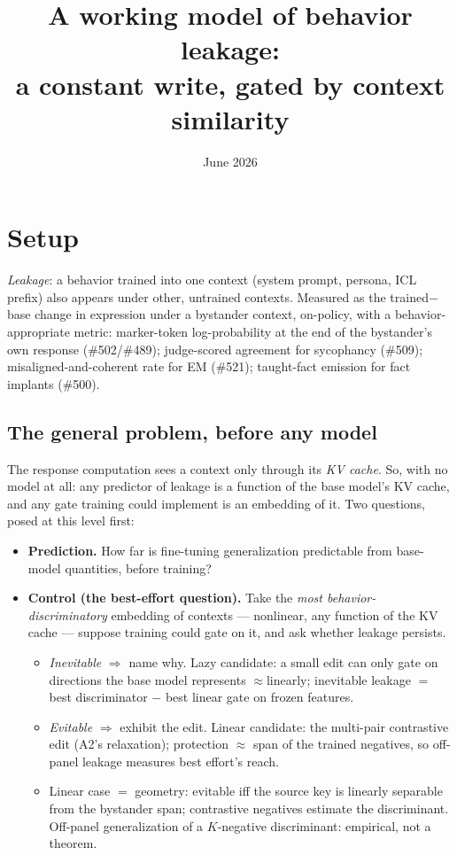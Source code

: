 \documentclass[11pt]{article}
\title{A working model of behavior leakage:\\ a constant write, gated by context similarity}
\author{}
\date{June 2026}
\begin{document}
\maketitle
\vspace{-3em}

\section{Setup}
\label{sec:setup}

\emph{Leakage}: a behavior trained into one context (system prompt, persona, ICL prefix) also appears under other, untrained contexts. Measured as the trained$-$base change in expression under a bystander context, on-policy, with a behavior-appropriate metric: marker-token log-probability at the end of the bystander's own response (\#502/\#489); judge-scored agreement for sycophancy (\#509); misaligned-and-coherent rate for EM (\#521); taught-fact emission for fact implants (\#500).

\subsection{The general problem, before any model}
\label{sec:general}

The response computation sees a context only through its \emph{KV cache}. So, with no model at all: any predictor of leakage is a function of the base model's KV cache, and any gate training could implement is an embedding of it. Two questions, posed at this level first:

\begin{itemize}
\item \textbf{Prediction.} How far is fine-tuning generalization predictable from base-model quantities, before training?
\item \textbf{Control (the best-effort question).} Take the \emph{most behavior-discriminatory} embedding of contexts --- nonlinear, any function of the KV cache --- suppose training could gate on it, and ask whether leakage persists.
  \begin{itemize}
  \item \emph{Inevitable} $\Rightarrow$ name why. Lazy candidate: a small edit can only gate on directions the base model represents $\approx$linearly; inevitable leakage $=$ best discriminator $-$ best linear gate on frozen features.
  \item \emph{Evitable} $\Rightarrow$ exhibit the edit. Linear candidate: the multi-pair contrastive edit (A2's relaxation); protection $\approx$ span of the trained negatives, so off-panel leakage measures best effort's reach.
  \item Linear case $=$ geometry: evitable iff the source key is linearly separable from the bystander span; contrastive negatives estimate the discriminant. Off-panel generalization of a $K$-negative discriminant: empirical, not a theorem.
  \end{itemize}
\end{itemize}
\end{document}
